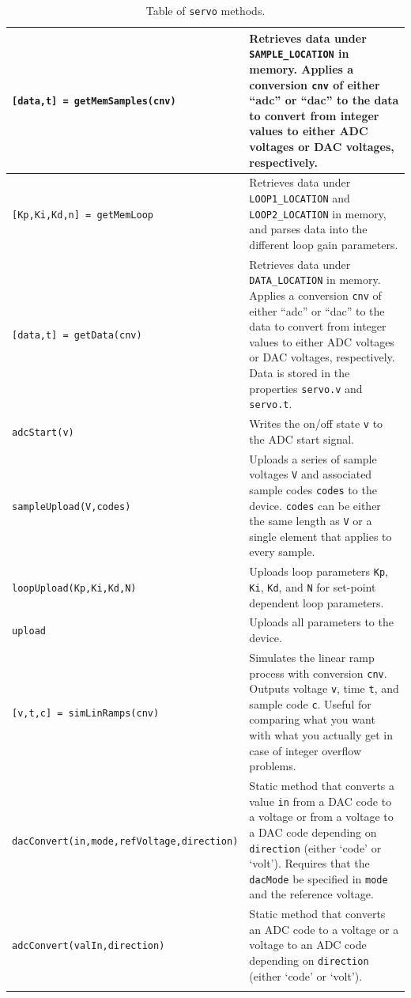 \documentclass{article}
\begin{document}
\begin{longtable}[c]{|l|p{8cm}|}
	\verb|[data,t] = getMemSamples(cnv)|	&Retrieves data under \verb|SAMPLE_LOCATION| in memory.  Applies a conversion \verb|cnv| of either ``adc'' or ``dac'' to the data to convert from integer values to either ADC voltages or DAC voltages, respectively.\\\hline
	\verb|[Kp,Ki,Kd,n] = getMemLoop|		&Retrieves data under \verb|LOOP1_LOCATION| and \verb|LOOP2_LOCATION| in memory, and parses data into the different loop gain parameters.\\\hline
	\verb|[data,t] = getData(cnv)|			&Retrieves data under \verb|DATA_LOCATION| in memory.  Applies a conversion \verb|cnv| of either ``adc'' or ``dac'' to the data to convert from integer values to either ADC voltages or DAC voltages, respectively.  Data is stored in the properties \verb|servo.v| and \verb|servo.t|.\\\hline
	\verb|adcStart(v)|				&Writes the on/off state \verb|v| to the ADC start signal.\\\hline
	\verb|sampleUpload(V,codes)|	&Uploads a series of sample voltages \verb|V| and associated sample codes \verb|codes| to the device.  \verb|codes| can be either the same length as \verb|V| or a single element that applies to every sample.\\\hline
	\verb|loopUpload(Kp,Ki,Kd,N)|	&Uploads loop parameters \verb|Kp|, \verb|Ki|, \verb|Kd|, and \verb|N| for set-point dependent loop parameters.\\\hline
	\verb|upload|					&Uploads all parameters to the device.\\\hline
	\verb|[v,t,c] = simLinRamps(cnv)|		&Simulates the linear ramp process with conversion \verb|cnv|.  Outputs voltage \verb|v|, time \verb|t|, and sample code \verb|c|.  Useful for comparing what you want with what you actually get in case of integer overflow problems.\\\hline
	\verb|dacConvert(in,mode,refVoltage,direction)|		&Static method that converts a value \verb|in| from a DAC code to a voltage or from a voltage to a DAC code depending on \verb|direction| (either `code' or `volt').  Requires that the \verb|dacMode| be specified in \verb|mode| and the reference voltage.\\\hline
	\verb|adcConvert(valIn,direction)|		&Static method that converts an ADC code to a voltage or a voltage to an ADC code depending on \verb|direction| (either `code' or `volt').\\\hline
	\caption{Table of \texttt{servo} methods.}
	\label{tb:servoMethods}
\end{longtable}
\end{document}

